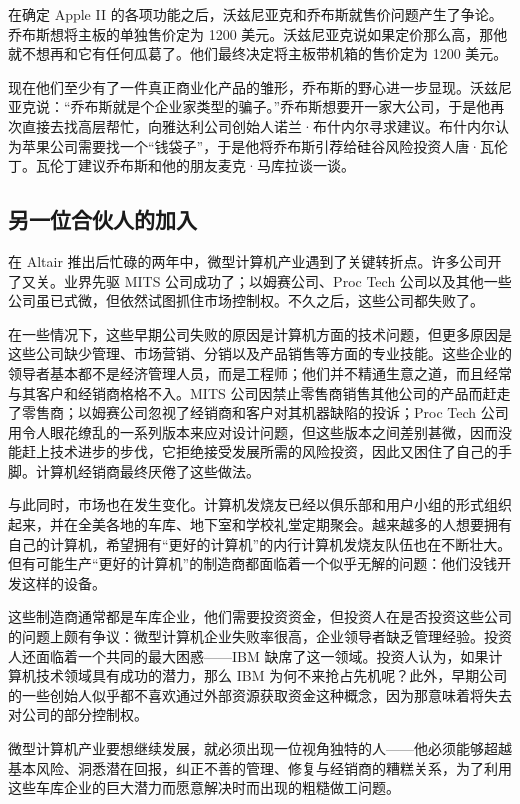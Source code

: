 \documentclass[12pt,UTF8]{ctexbook}
\begin{document}
在确定 Apple II 的各项功能之后，沃兹尼亚克和乔布斯就售价问题产生了争论。乔布斯想将主板的单独售价定为 1200 美元。沃兹尼亚克说如果定价那么高，那他就不想再和它有任何瓜葛了。他们最终决定将主板带机箱的售价定为 1200 美元。

现在他们至少有了一件真正商业化产品的雏形，乔布斯的野心进一步显现。沃兹尼亚克说：“乔布斯就是个企业家类型的骗子。”乔布斯想要开一家大公司，于是他再次直接去找高层帮忙，向雅达利公司创始人诺兰·布什内尔寻求建议。布什内尔认为苹果公司需要找一个“钱袋子”，于是他将乔布斯引荐给硅谷风险投资人唐·瓦伦丁。瓦伦丁建议乔布斯和他的朋友麦克·马库拉谈一谈。





\subsection{另一位合伙人的加入}


在 Altair 推出后忙碌的两年中，微型计算机产业遇到了关键转折点。许多公司开了又关。业界先驱 MITS 公司成功了；以姆赛公司、Proc Tech 公司以及其他一些公司虽已式微，但依然试图抓住市场控制权。不久之后，这些公司都失败了。

在一些情况下，这些早期公司失败的原因是计算机方面的技术问题，但更多原因是这些公司缺少管理、市场营销、分销以及产品销售等方面的专业技能。这些企业的领导者基本都不是经济管理人员，而是工程师；他们并不精通生意之道，而且经常与其客户和经销商格格不入。MITS 公司因禁止零售商销售其他公司的产品而赶走了零售商；以姆赛公司忽视了经销商和客户对其机器缺陷的投诉；Proc Tech 公司用令人眼花缭乱的一系列版本来应对设计问题，但这些版本之间差别甚微，因而没能赶上技术进步的步伐，它拒绝接受发展所需的风险投资，因此又困住了自己的手脚。计算机经销商最终厌倦了这些做法。

与此同时，市场也在发生变化。计算机发烧友已经以俱乐部和用户小组的形式组织起来，并在全美各地的车库、地下室和学校礼堂定期聚会。越来越多的人想要拥有自己的计算机，希望拥有“更好的计算机”的内行计算机发烧友队伍也在不断壮大。但有可能生产“更好的计算机”的制造商都面临着一个似乎无解的问题：他们没钱开发这样的设备。

这些制造商通常都是车库企业，他们需要投资资金，但投资人在是否投资这些公司的问题上颇有争议：微型计算机企业失败率很高，企业领导者缺乏管理经验。投资人还面临着一个共同的最大困惑——IBM 缺席了这一领域。投资人认为，如果计算机技术领域具有成功的潜力，那么 IBM 为何不来抢占先机呢？此外，早期公司的一些创始人似乎都不喜欢通过外部资源获取资金这种概念，因为那意味着将失去对公司的部分控制权。

微型计算机产业要想继续发展，就必须出现一位视角独特的人——他必须能够超越基本风险、洞悉潜在回报，纠正不善的管理、修复与经销商的糟糕关系，为了利用这些车库企业的巨大潜力而愿意解决时而出现的粗糙做工问题。
\end{document}
